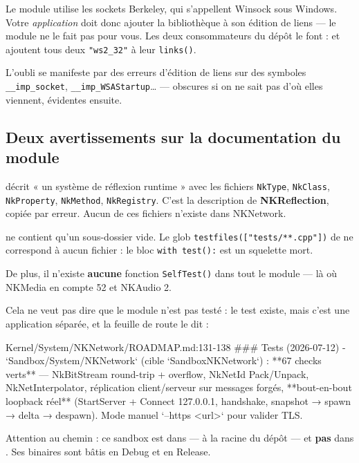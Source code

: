\begin{nkpiege}
Le module utilise les sockets Berkeley, qui s'appellent Winsock sous Windows.
Votre \emph{application} doit donc ajouter la bibliothèque à son édition de
liens — le module ne le fait pas pour vous. Les deux consommateurs du dépôt le
font :
 et
 ajoutent tous deux
\texttt{"ws2\_32"} à leur \texttt{links()}.

L'oubli se manifeste par des erreurs d'édition de liens sur des symboles
\texttt{\_\_imp\_socket}, \texttt{\_\_imp\_WSAStartup}\dots{} — obscures si on ne
sait pas d'où elles viennent, évidentes ensuite.
\end{nkpiege}

\subsection{Deux avertissements sur la documentation du module}

\begin{nkpiege}
 décrit « un système de
réflexion runtime » avec les fichiers \texttt{NkType}, \texttt{NkClass},
\texttt{NkProperty}, \texttt{NkMethod}, \texttt{NkRegistry}. C'est la description
de \textbf{NKReflection}, copiée par erreur. Aucun de ces fichiers n'existe dans
NKNetwork.
\end{nkpiege}

\begin{nkpiege}
 ne contient qu'un sous-dossier vide. Le
glob \texttt{testfiles(["tests/**.cpp"])} de  ne
correspond à aucun fichier : le bloc \texttt{with test():} est un squelette mort.

De plus, il n'existe \textbf{aucune} fonction \texttt{SelfTest()} dans tout le
module — là où NKMedia en compte 52 et NKAudio 2.

Cela ne veut pas dire que le module n'est pas testé : le test existe, mais c'est
une application séparée, et la feuille de route le dit :

\begin{nkcode}{Kernel/System/NKNetwork/ROADMAP.md:131-138}
 ### Tests (2026-07-12)
 - `Sandbox/System/NKNetwork` (cible `SandboxNKNetwork`) : **67 checks verts** —
   NkBitStream round-trip + overflow, NkNetId Pack/Unpack, NkNetInterpolator,
   réplication client/serveur sur messages forgés, **bout-en-bout loopback réel**
   (StartServer + Connect 127.0.0.1, handshake, snapshot → spawn → delta →
   despawn). Mode manuel `--https <url>` pour valider TLS.
\end{nkcode}

Attention au chemin : ce sandbox est dans  — à
la racine du dépôt — et \textbf{pas} dans . Ses
binaires sont bâtis en Debug et en Release.
\end{nkpiege}

